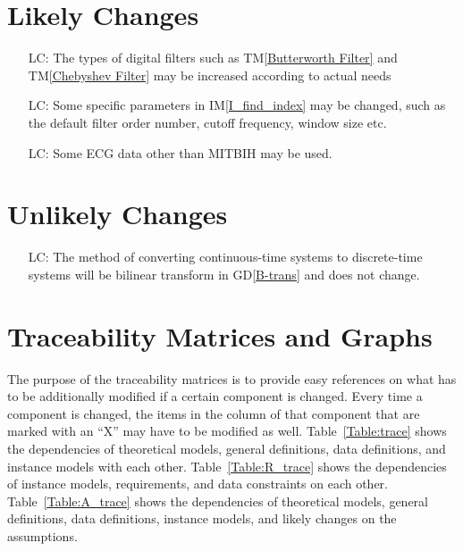 \documentclass[12pt]{article}
\newcounter{defnum} %
\newcommand{\dref}[1]{GD\ref{#1}} \newcounter{datadefnum} %
\newcommand{\tref}[1]{TM\ref{#1}} \newcounter{tablenum} %
\newcommand{\iref}[1]{IM\ref{#1}} \newcounter{reqnum} %
\begin{document}


\section{Likely Changes}    

\noindent \begin{itemize}

\item[LC\refstepcounter{lcnum}\thelcnum\label{LC_filters}:] The types of digital
filters such as \tref{Butterworth Filter} and \tref{Chebyshev Filter} may be
increased according to actual needs

\item[LC\refstepcounter{lcnum}\thelcnum\label{LC_parameters}:] Some specific
parameters in \iref{I_find_index} may be changed, such as the default filter
order number, cutoff frequency, window size etc.

\item[LC\refstepcounter{lcnum}\thelcnum\label{LC_database}:] Some ECG data other
than MITBIH may be used.

\end{itemize}

\section{Unlikely Changes}    

\noindent \begin{itemize}

\item[LC\refstepcounter{lcnum}\thelcnum\label{LC_convert}:] The method of
converting continuous-time systems to discrete-time systems will be bilinear
transform in \dref{B-trans} and does not change.

\end{itemize}

\section{Traceability Matrices and Graphs}

The purpose of the traceability matrices is to provide easy references on what
has to be additionally modified if a certain component is changed.  Every time a
component is changed, the items in the column of that component that are marked
with an ``X'' may have to be modified as well.  Table~\ref{Table:trace} shows
the dependencies of theoretical models, general definitions, data definitions,
and instance models with each other. Table~\ref{Table:R_trace} shows the
dependencies of instance models, requirements, and data constraints on each
other. Table~\ref{Table:A_trace} shows the dependencies of theoretical models,
general definitions, data definitions, instance models, and likely changes on
the assumptions.
\end{document}
